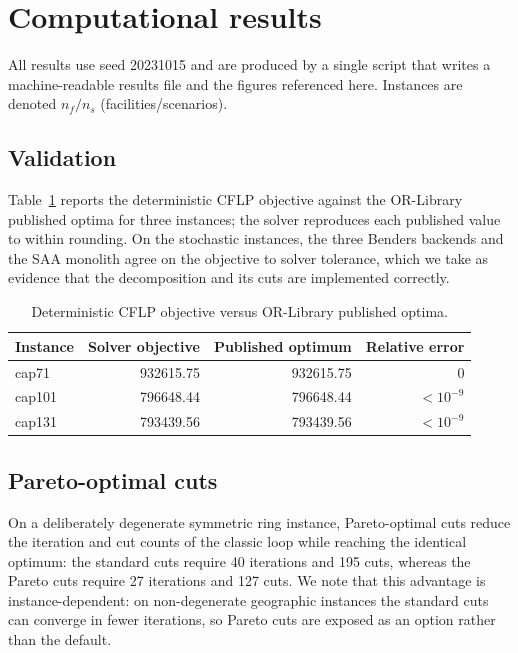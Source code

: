 \documentclass[11pt]{article}
\newcommand{\paretoStdIters}{40}
\newcommand{\paretoStdCuts}{195}
\newcommand{\paretoParIters}{27}
\newcommand{\paretoParCuts}{127}
\begin{document}
\section{Computational results}
\label{sec:results}

All results use seed 20231015 and are produced by a single script that writes
a machine-readable results file and the figures referenced here. Instances are
denoted $n_f/n_s$ (facilities/scenarios).

\subsection{Validation}
Table~\ref{tab:orlib} reports the deterministic CFLP objective against the
OR-Library published optima for three instances; the solver reproduces each
published value to within rounding. On the stochastic instances, the three Benders
backends and the SAA monolith agree on the objective to solver tolerance, which we
take as evidence that the decomposition and its cuts are implemented correctly.

\begin{table}[t]
  \centering
  \caption{Deterministic CFLP objective versus OR-Library published optima.}
  \label{tab:orlib}
  \begin{tabular}{lrrr}
    \toprule
    Instance & Solver objective & Published optimum & Relative error \\
    \midrule
    cap71  & 932615.75 & 932615.75 & $0$ \\
    cap101 & 796648.44 & 796648.44 & ${<}10^{-9}$ \\
    cap131 & 793439.56 & 793439.56 & ${<}10^{-9}$ \\
    \bottomrule
  \end{tabular}
\end{table}

\subsection{Pareto-optimal cuts}
On a deliberately degenerate symmetric ring instance, Pareto-optimal cuts reduce
the iteration and cut counts of the classic loop while reaching the identical
optimum: the standard cuts require \paretoStdIters{} iterations and
\paretoStdCuts{} cuts, whereas the Pareto cuts require \paretoParIters{} iterations
and \paretoParCuts{} cuts. We note that this advantage is instance-dependent: on
non-degenerate geographic instances the standard cuts can converge in fewer
iterations, so Pareto cuts are exposed as an option rather than the default.
\end{document}
